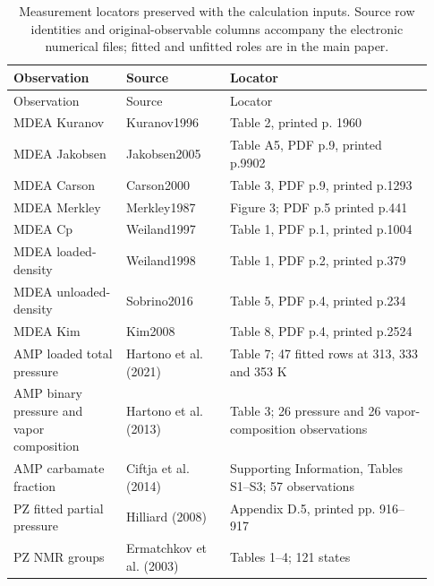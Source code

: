 \begin{longtable}{@{}>{\raggedright\arraybackslash}p{0.25\linewidth}>{\raggedright\arraybackslash}p{0.23\linewidth}>{\raggedright\arraybackslash}p{0.45\linewidth}@{}}
\caption{Measurement locators preserved with the calculation inputs. Source row identities and original-observable columns accompany the electronic numerical files; fitted and unfitted roles are in the main paper.}\label{tab:p2-source-locators}\\
\toprule Observation & Source & Locator \\ \midrule\endfirsthead
\toprule Observation & Source & Locator \\ \midrule\endhead
\bottomrule\endfoot
MDEA Kuranov & Kuranov1996 \cite{kuranovSolubilitySingleGases1996} & Table 2, printed p. 1960 \\
MDEA Jakobsen & Jakobsen2005 \cite{Jakobsen2005} & Table A5, PDF p.9, printed p.9902 \\
MDEA Carson & Carson2000 \cite{carsonEnthalpySolutionCarbon2000} & Table 3, PDF p.9, printed p.1293 \\
MDEA Merkley & Merkley1987 \cite{merkleyEnthalpiesAbsorptionCarbon1987} & Figure 3; PDF p.5 printed p.441 \\
MDEA Cp & Weiland1997 \cite{weilandHeatCapacityAqueous1997} & Table 1, PDF p.1, printed p.1004 \\
MDEA loaded-density & Weiland1998 \cite{Weiland1998} & Table 1, PDF p.2, printed p.379 \\
MDEA unloaded-density & Sobrino2016 \cite{sobrinoViscosityDensityMeasurements2016} & Table 5, PDF p.4, printed p.234 \\
MDEA Kim & Kim2008 \cite{kimEbulliometricDeterminationVaporLiquid2008} & Table 8, PDF p.4, printed p.2524 \\
AMP loaded total pressure & Hartono et al. (2021) \cite{hartonoNewSolubilityHeat2021} & Table 7; 47 fitted rows at 313, 333 and 353 K \\
AMP binary pressure and vapor composition & Hartono et al. (2013) \cite{hartonoBinaryTernaryVLE2013} & Table 3; 26 pressure and 26 vapor-composition observations \\
AMP carbamate fraction & Ciftja et al. (2014) \cite{ciftjaExperimentalStudyCarbamate2014a} & Supporting Information, Tables S1--S3; 57 observations \\
PZ fitted partial pressure & Hilliard (2008) \cite{Hilliard2008} & Appendix D.5, printed pp. 916--917 \\
PZ NMR groups & Ermatchkov et al. (2003) \cite{ermatchkovChemicalEquilibriumConstants2003} & Tables 1--4; 121 states \\

\end{longtable}
